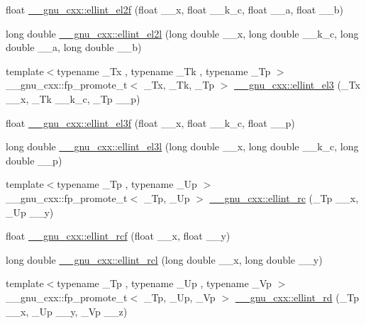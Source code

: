 \begin{DoxyCompactItemize}
\item 
float \hyperlink{group__gnu__math__spec__func_ga0bf7469fe7ac92e9a2ffa0f92ea62248}{\+\_\+\+\_\+gnu\+\_\+cxx\+::ellint\+\_\+el2f} (float \+\_\+\+\_\+x, float \+\_\+\+\_\+k\+\_\+c, float \+\_\+\+\_\+a, float \+\_\+\+\_\+b)
\item 
long double \hyperlink{group__gnu__math__spec__func_ga491439a09e6000659444f52dc3c9f215}{\+\_\+\+\_\+gnu\+\_\+cxx\+::ellint\+\_\+el2l} (long double \+\_\+\+\_\+x, long double \+\_\+\+\_\+k\+\_\+c, long double \+\_\+\+\_\+a, long double \+\_\+\+\_\+b)
\item 
{\footnotesize template$<$typename \+\_\+\+Tx , typename \+\_\+\+Tk , typename \+\_\+\+Tp $>$ }\\\+\_\+\+\_\+gnu\+\_\+cxx\+::fp\+\_\+promote\+\_\+t$<$ \+\_\+\+Tx, \+\_\+\+Tk, \+\_\+\+Tp $>$ \hyperlink{group__gnu__math__spec__func_gaac07922e08fdf46cd509ff0cfa9ea1f0}{\+\_\+\+\_\+gnu\+\_\+cxx\+::ellint\+\_\+el3} (\+\_\+\+Tx \+\_\+\+\_\+x, \+\_\+\+Tk \+\_\+\+\_\+k\+\_\+c, \+\_\+\+Tp \+\_\+\+\_\+p)
\item 
float \hyperlink{group__gnu__math__spec__func_ga66131a8ecc14b5228a73a01121f60a35}{\+\_\+\+\_\+gnu\+\_\+cxx\+::ellint\+\_\+el3f} (float \+\_\+\+\_\+x, float \+\_\+\+\_\+k\+\_\+c, float \+\_\+\+\_\+p)
\item 
long double \hyperlink{group__gnu__math__spec__func_ga0d90e66f799a2ebe4bec43eef0d53355}{\+\_\+\+\_\+gnu\+\_\+cxx\+::ellint\+\_\+el3l} (long double \+\_\+\+\_\+x, long double \+\_\+\+\_\+k\+\_\+c, long double \+\_\+\+\_\+p)
\item 
{\footnotesize template$<$typename \+\_\+\+Tp , typename \+\_\+\+Up $>$ }\\\+\_\+\+\_\+gnu\+\_\+cxx\+::fp\+\_\+promote\+\_\+t$<$ \+\_\+\+Tp, \+\_\+\+Up $>$ \hyperlink{group__gnu__math__spec__func_ga7d3d42f5f71a74266be8aaca528056bf}{\+\_\+\+\_\+gnu\+\_\+cxx\+::ellint\+\_\+rc} (\+\_\+\+Tp \+\_\+\+\_\+x, \+\_\+\+Up \+\_\+\+\_\+y)
\item 
float \hyperlink{group__gnu__math__spec__func_gaad5316092224ec3d92b66e79ef266adf}{\+\_\+\+\_\+gnu\+\_\+cxx\+::ellint\+\_\+rcf} (float \+\_\+\+\_\+x, float \+\_\+\+\_\+y)
\item 
long double \hyperlink{group__gnu__math__spec__func_ga9b2f1cdeacd3615c702a77d995a0129c}{\+\_\+\+\_\+gnu\+\_\+cxx\+::ellint\+\_\+rcl} (long double \+\_\+\+\_\+x, long double \+\_\+\+\_\+y)
\item 
{\footnotesize template$<$typename \+\_\+\+Tp , typename \+\_\+\+Up , typename \+\_\+\+Vp $>$ }\\\+\_\+\+\_\+gnu\+\_\+cxx\+::fp\+\_\+promote\+\_\+t$<$ \+\_\+\+Tp, \+\_\+\+Up, \+\_\+\+Vp $>$ \hyperlink{group__gnu__math__spec__func_gad29dae6abc783c8fe952dba477e65309}{\+\_\+\+\_\+gnu\+\_\+cxx\+::ellint\+\_\+rd} (\+\_\+\+Tp \+\_\+\+\_\+x, \+\_\+\+Up \+\_\+\+\_\+y, \+\_\+\+Vp \+\_\+\+\_\+z)

\end{DoxyCompactItemize}
